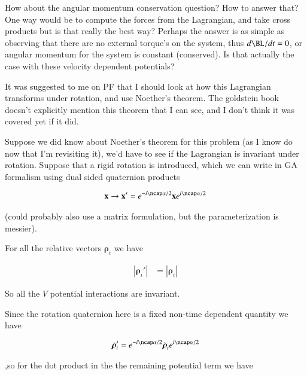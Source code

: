 \documentclass{article}
\newcommand{\Brho}[0]{\boldsymbol{\rho}}
\newcommand{\Abs}[1]{\left\lvert{#1}\right\rvert}
\begin{document}
How about the angular momentum conservation question?  How to answer that?  One way would be to compute the forces from the Lagrangian, and take cross products but is that really the best way?  Perhaps the answer is as simple as observing that there are no external torque's on the system, thus $d\BL/dt = 0$, or angular momentum for the system is constant (conserved).  Is that actually the case 
with these velocity dependent potentials?

It was suggested to me on PF that I should look at how this Lagrangian transforms under rotation, and use Noether's theorem.
The goldstein book doesn't explicitly mention this theorem that I can see, and I don't think it was covered yet if it did.

Suppose we did know about Noether's theorem for this problem (as I know do now that I'm revisiting it), we'd have to
see if the Lagrangian is invariant under rotation.  Suppose that a rigid rotation is introduced, which we can write in GA
formalism using dual sided quaternion products

\begin{align*}
\Bx \rightarrow \Bx' = e^{-i\ncap \alpha/2} \Bx e^{i\ncap\alpha/2}
\end{align*}

(could probably also use a matrix formulation, but the parameterization is messier).

For all the relative vectors $\Brho_i$ we have

\begin{align*}
\Abs{\Brho_i'} &= \Abs{\Brho_i}
\end{align*}

So all the $V$ potential interactions are invariant.  

Since the rotation quaternion here is a fixed non-time dependent quantity we have

\begin{align*}
\dot{\Brho}_i' = e^{-i\ncap \alpha/2} \dot{\Brho}_i e^{i\ncap\alpha/2}
\end{align*}

,so for the dot product in the the remaining potential term we have
\end{document}
